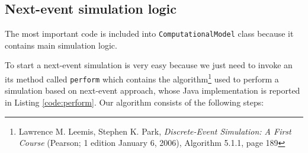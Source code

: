 \documentclass[10pt,a4paper]{article}
\begin{document}
\subsection{Next-event simulation logic}

The most important code is included into \texttt{ComputationalModel} class because it contains main simulation logic.

To start a next-event simulation is very easy because we just need to invoke an its method called \texttt{perform} which contains the algorithm\footnote{Lawrence M. Leemis, Stephen K. Park, \textit{Discrete-Event Simulation: A First Course} (Pearson; 1 edition January 6, 2006), Algorithm 5.1.1, page 189} used to perform a simulation based on next-event approach, whose Java implementation is reported in Listing \ref{code:perform}. Our algorithm consists of the following steps: 
\end{document}
